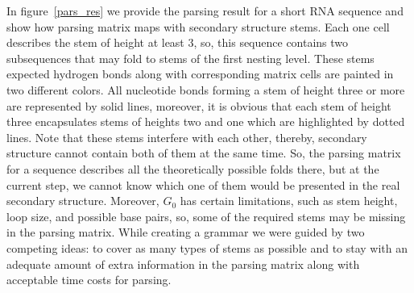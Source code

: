 In figure~\ref{pars_res} we provide the parsing result for a short RNA sequence and show how parsing matrix maps with secondary structure stems. Each one cell describes the stem of height at least 3, so, this sequence contains two subsequences that may fold to stems of the first nesting level. These stems expected hydrogen bonds along with corresponding matrix cells are painted in two different colors. All nucleotide bonds forming a stem of height three or more are represented by solid lines, moreover, it is obvious that each stem of height three encapsulates stems of heights two and one which are highlighted by dotted lines. Note that these stems interfere with each other, thereby, secondary structure cannot contain both of them at the same time. So, the parsing matrix for a sequence describes all the theoretically possible folds there, but at the current step, we cannot know which one of them would be presented in the real secondary structure. Moreover, $G_0$ has certain limitations, such as stem height, loop size, and possible base pairs, so, some of the required stems may be missing in the parsing matrix. While creating a grammar we were guided by two competing ideas: to cover as many types of stems as possible and to stay with an adequate amount of extra information in the parsing matrix along with acceptable time costs for parsing.

